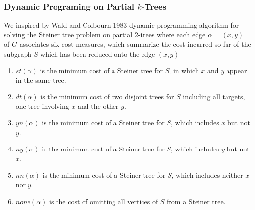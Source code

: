 \documentclass{beamer}
\begin{document}
\begin{frame}
\frametitle{Dynamic Programing on Partial $k$-Trees}
We inspired by Wald and Colbourn 1983 dynamic programming algorithm for solving the Steiner tree problem on partial 2-trees where each edge $\alpha = (x, y)$ of $G$ associates six cost measures, which summarize the cost incurred so far of the subgraph $S$ which has been reduced onto the edge $(x , y )$
\begin{enumerate}
\item $st(\alpha)$ is the minimum cost of a Steiner tree for $S$, in which $x$ and $y$ appear in the same tree.
\item $dt(\alpha)$ is the minimum cost of two disjoint trees for $S$ including all targets, one tree involving $x$ and the other $y$.
\item  $yn(\alpha)$ is the minimum cost of a Steiner tree for $S$, which includes $x$ but not $y$.
\item $ny(\alpha)$ is the minimum cost of a Steiner tree for $S$, which includes $y$ but not $x$.
\item $nn(\alpha)$ is the minimum cost of a Steiner tree for $S$, which includes neither $x$ nor $y$.
\item $none(\alpha)$ is the cost of omitting all vertices of $S$ from a Steiner tree.
\end{enumerate}
\end{frame}
\end{document}

